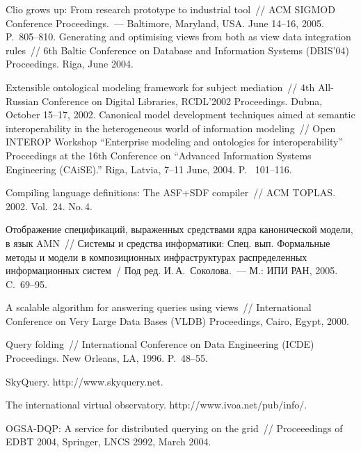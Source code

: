 \begin{multicols}{2}
{{\begin{thebibliography}{99}
Clio grows up: From research prototype to industrial tool~// ACM SIGMOD Conference
Proceedings.~--- Baltimore, Maryland, USA. June 14--16, 2005. P.~805--810.
Gen\-er\-ating and optimising views from both as view data integration rules~// 6th Baltic
Conference on Database and Information Systems (DBIS'04) Proceedings. Riga, June 2004.

Extensible ontological modeling framework for subject mediation~// 4th All-Russian Conference
on Digital Libraries, RCDL'2002 Proceedings. Dubna, October 15--17, 2002.
Canonical model development techniques aimed at semantic interoperability in the
heterogeneous world of information modeling~// Open INTEROP Workshop ``Enterprise
modeling and ontologies for interoperability'' Proceedings at the 16th Conference on ``Advanced
Information Systems Engineering (CAiSE).'' Riga, Latvia, 7--11 June, 2004. P.~ 101--116.

Compiling language definitions: The ASF\;+\;SDF compiler~// ACM TOPLAS. 2002. Vol.~24.
No.\,4.

Отображение спецификаций, выраженных средствами ядра канонической модели, в язык
AMN~// Системы и средства информатики: Спец. вып. Формальные методы и модели в
композиционных инфраструктурах распределенных информационных систем~/ Под ред.
И.\,А.~Соколова.~--- М.: ИПИ РАН, 2005. C.~69--95.

A scalable algorithm for answering queries using views~// International Conference on Very
Large Data Bases (VLDB) Proceedings, Cairo, Egypt, 2000.

Query folding~// International Conference on Data Engineering (ICDE) Proceedings. New
Orleans, LA, 1996. P.~48--55.

SkyQuery. {\sf http://www.skyquery.net}.

The international virtual observatory. {\sf http://www.ivoa.net/pub/info/}.
\label{end\stat}

OGSA-DQP: A service for distributed querying on the grid~//
Proceeedings of EDBT 2004,
Springer,  LNCS 2992, March 2004.

\end{thebibliography}

}
}
\end{multicols}